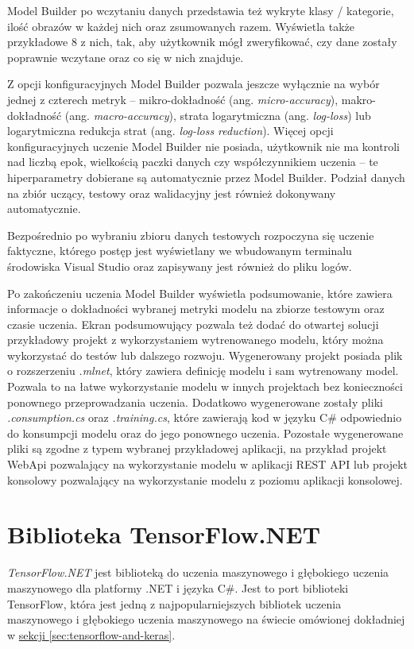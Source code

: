 Model Builder po wczytaniu danych przedstawia też wykryte klasy / kategorie, ilość obrazów w każdej nich oraz zsumowanych razem.
Wyświetla także przykładowe 8 z nich, tak, aby użytkownik mógł zweryfikować, czy dane zostały poprawnie wczytane oraz co się w nich znajduje.

Z opcji konfiguracyjnych Model Builder pozwala jeszcze wyłącznie na wybór jednej z czterech metryk -- mikro-dokładność (ang. \emph{micro-accuracy}), makro-dokładność (ang. \emph{macro-accuracy}), strata logarytmiczna (ang. \emph{log-loss}) lub logarytmiczna redukcja strat (ang. \emph{log-loss reduction}).
Więcej opcji konfiguracyjnych uczenie Model Builder nie posiada, użytkownik nie ma kontroli nad liczbą epok, wielkością paczki danych czy współczynnikiem uczenia -- te hiperparametry dobierane są automatycznie przez Model Builder.
Podział danych na zbiór uczący, testowy oraz walidacyjny jest również dokonywany automatycznie.

Bezpośrednio po wybraniu zbioru danych testowych rozpoczyna się uczenie faktyczne, którego postęp jest wyświetlany we wbudowanym terminalu środowiska Visual Studio oraz zapisywany jest również do pliku logów.

Po zakończeniu uczenia Model Builder wyświetla podsumowanie, które zawiera informacje o dokładności wybranej metryki modelu na zbiorze testowym oraz czasie uczenia.
Ekran podsumowujący pozwala też dodać do otwartej solucji przykładowy projekt z wykorzystaniem wytrenowanego modelu, który można wykorzystać do testów lub dalszego rozwoju.
Wygenerowany projekt posiada plik o rozszerzeniu \emph{.mlnet}, który zawiera definicję modelu i sam wytrenowany model.
Pozwala to na łatwe wykorzystanie modelu w innych projektach bez konieczności ponownego przeprowadzania uczenia.
Dodatkowo wygenerowane zostały pliki \emph{.consumption.cs} oraz \emph{.training.cs}, które zawierają kod w języku C\# odpowiednio do konsumpcji modelu oraz do jego ponownego uczenia.
Pozostałe wygenerowane pliki są zgodne z typem wybranej przykładowej aplikacji, na przykład projekt WebApi pozwalający na wykorzystanie modelu w aplikacji REST API lub projekt konsolowy pozwalający na wykorzystanie modelu z poziomu aplikacji konsolowej.

\section{Biblioteka TensorFlow.NET}
\label{sec:tensorflownet}

\emph{TensorFlow.NET} jest biblioteką do uczenia maszynowego i głębokiego uczenia maszynowego dla platformy .NET i języka C\#.
Jest to port biblioteki TensorFlow, która jest jedną z najpopularniejszych bibliotek uczenia maszynowego i głębokiego uczenia maszynowego na świecie omówionej dokładniej w \hyperref[sec:tensorflow-and-keras]{sekcji \ref*{sec:tensorflow-and-keras}}.

